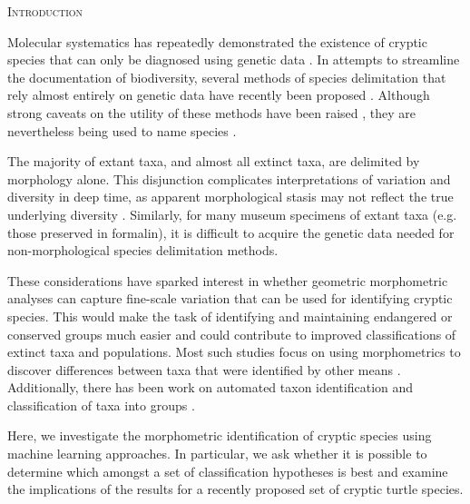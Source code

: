 \documentclass[12pt,letterpaper]{article}
\renewcommand{\section}[1]{%
\bigskip
\begin{center}
\begin{Large}
\normalfont\scshape #1
\medskip
\end{Large}
\end{center}}
\begin{document}
\section{Introduction}
Molecular systematics has repeatedly demonstrated the existence of cryptic species that can only be diagnosed using genetic data \citep{Stuart2006,Bickford2007,SchlickSteiner2007,Pfenninger2007,Clare2011,Funk2012}. In attempts to streamline the documentation of biodiversity, several methods of species delimitation that rely almost entirely on genetic data have recently been proposed \citep{Pons2006,Carstens2010,Hausdorf2010,O'Meara2010,Yang2010b,Huelsenbeck2011b}. Although strong caveats on the utility of these methods have been raised \citep{Bauer2000,Carstens2013}, they are nevertheless being used to name species \citep{Leache2010,Spinks2014}.

The majority of extant taxa, and almost all extinct taxa, are delimited by morphology alone. This disjunction complicates interpretations of variation and diversity in deep time, as apparent morphological stasis may not reflect the true underlying diversity \citep{Eldredge1972,Gould1977a,Hunt2008,VanBocxlaer2013}. Similarly, for many museum specimens of extant taxa (e.g. those preserved in formalin), it is difficult to acquire the genetic data needed for non-morphological species delimitation methods.

These considerations have sparked interest in whether geometric morphometric analyses can capture fine-scale variation that can be used for identifying cryptic species. This would make the task of identifying and maintaining endangered or conserved groups much easier and could contribute to improved classifications of extinct taxa and populations. Most such studies focus on using morphometrics to discover differences between taxa that were identified by other means \citep{Polly2003,Zelditch2004,Gaubert2005b,Gunduz2007,Polly2007a,Demandt2009}. Additionally, there has been work on automated taxon identification and classification of taxa into groups \citep{Baylac2003,Dobigny2003,MacLeod2007,VandenBrink2011}. 

Here, we investigate the morphometric identification of cryptic species using machine learning approaches. In particular, we ask whether it is possible to determine which amongst a set of classification hypotheses is best and examine the implications of the results for a recently proposed set of cryptic turtle species.
\end{document}
